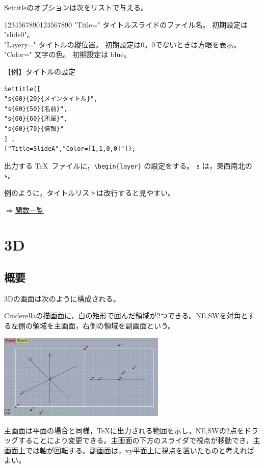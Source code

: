 \documentclass[papersize,a4paper,12pt,uplatex]{jsarticle}
\begin{document}
\begin{description}
Settitleのオプションは次をリストで与える。

\begin{tabbing}
123456789012\=4567890\=\kill
"Title=" \> タイトルスライドのファイル名。 初期設定は "slide0"。\\
"Layery=" \> タイトルの縦位置。 初期設定は0。0でないときは方眼を表示。 \\
"Color="\> 文字の色。 初期設定は blue。
\end{tabbing}

\vspace{\baselineskip}
【例】タイトルの設定

\begin{verbatim}
Settitle([ 
"s{60}{20}{メインタイトル}", 
"s{60}{50}{名前}", 
"s{60}{60}{所属}", 
"s{60}{70}{情報}" 
] , 
["Title=SlideA","Color=[1,1,0,0]"]); 
\end{verbatim}

出力する \TeX\ ファイルに，\verb|\begin{layer}| の設定をする。 \verb|s| は，東西南北の\verb|s|。

例のように，タイトルリストは改行すると見やすい。

\end{description}

\begin{flushright}\hyperlink{functionlist}{$\Rightarrow$関数一覧}\end{flushright}

\newpage
\section{\ketcindy 3D}
\subsection{概要}
\ketcindy 3Dの画面は次のように構成される。

Cinderellaの描画面に，白の矩形で囲んだ領域が2つできる。NE,SWを対角とする左側の領域を主画面，右側の領域を副画面という。

\vspace{\baselineskip}
\begin{center}
 \includegraphics[bb=0 0 879.05 447.02 , width=8cm]{Fig/3dstart.pdf}
\end{center}
主画面は平面の場合と同様，TeXに出力される範囲を示し，NE,SWの2点をドラッグすることにより変更できる。主画面の下方のスライダで視点が移動でき，主画面上では軸が回転する。副画面は，xy平面上に視点を置いたものと考えればよい。
\end{document}

